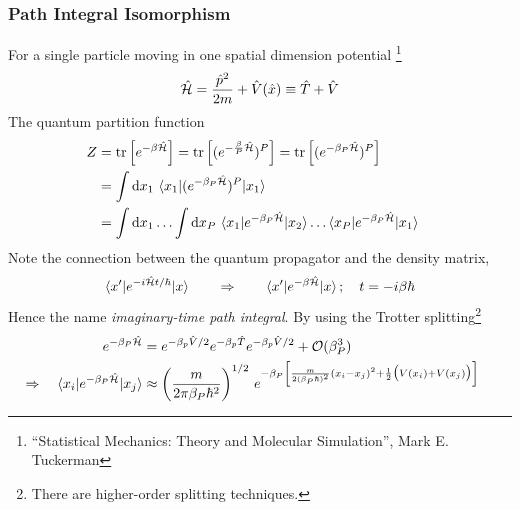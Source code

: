 \begin{frame}[allowframebreaks]
  \frametitle{Path Integral Isomorphism}
  For a single particle moving in one spatial dimension potential
  \footnote[frame]{
   ``Statistical Mechanics: Theory and Molecular Simulation'', Mark E. Tuckerman 
  }
  $$
  \hat{\cal H} = \frac{\hat{p}^2}{2m} + \hat{V}(\hat{x}) \equiv \hat{T} + \hat{V}
  $$
  The quantum partition function
  \begin{align*}
    \label{eq:quantum_partition_function}
    Z &= \operatorname{tr}\left[e^{-\beta\hat{\cal H}}\right]
        = \operatorname{tr}\left[(e^{-{\beta\over P}\hat{\cal H}})^P\right]
        = \operatorname{tr}\left[(e^{-{\beta_P}\hat{\cal H}})^P\right]
        \cr
    &= \int\mathrm{d}x_1\,
      \braket{ x_1| (e^{-\beta_P\hat{\cal H}})^P | x_1} \cr
    &= \int\mathrm{d}x_1\ldots\int\mathrm{d}x_P\,
      \braket{ x_1| e^{-\beta_P\hat{\cal H}} | x_2}
      \ldots
      \braket{ x_P| e^{-\beta_P\hat{\cal H}} | x_1}
  \end{align*}
  Note the connection between the quantum propagator and the density matrix,
  \begin{equation*}
    \label{eq:density_mat_and_propagator}
    \braket{ x'| e^{-i\hat{\cal H} t/\hbar} | x}
    \qquad\Rightarrow\qquad
    \braket{ x'| e^{-\beta\hat{\cal H}} | x};\quad t = -i\beta\hbar
  \end{equation*}
  Hence the name \emph{imaginary-time path integral}. By using the Trotter splitting\footnote[frame]{
    There are higher-order splitting techniques.
  }
  \begin{align*}
    e^{-\beta_P\hat{\cal H}} &=
    e^{-\beta_p\hat{V}/2}e^{-\beta_p\hat{T}}e^{-\beta_p\hat{V}/2} +
    {\cal O}(\beta_P^3) \cr
    \Rightarrow \quad \braket{ x_i| e^{-\beta_P\hat{\cal H}} | x_j} &\approx
    \left(m \over2\pi\beta_P\hbar^2\right)^{1/2}\,
    e^{
      -\beta_P
      \left[
         {m\over2(\beta_P\hbar)^2} (x_i - x_j)^2
                                                          + 
        {1\over2} \bigl(V(x_i) + V(x_j)\bigr)
      \right]
    }
  \end{align*}
  

\end{frame}

